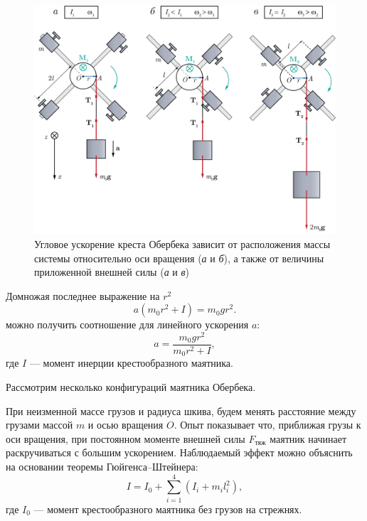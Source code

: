 \documentclass[All.tex]{subfiles}
\begin{document}
		\begin{figure}[H] 	
		\centering 	
		\includegraphics[width=0.9\linewidth]{oberbeck-4.png}
		\caption{Угловое ускорение креста Обербека зависит от расположения массы системы относительно оси вращения (\textit{а} и \textit{б}), а также от величины приложенной внешней силы (\textit{а} и \textit{в})}
		\label{oberbeck-4}
	\end{figure}
	
	
	Домножая последнее выражение на $ r^{2} $
	\begin{equation}\label{oberbeck-eq7}
	a(m_0r^{2} + I) = m_0gr^{2}.
	\end{equation}
	можно получить соотношение для линейного ускорения $ a $:
		\begin{equation}\label{oberbeck-eq8}
	a = \frac{m_0gr^{2}}{m_0r^{2} + I},
	\end{equation}
	где $ I $ — момент инерции крестообразного маятника.
	
   Рассмотрим несколько конфигураций маятника Обербека.
            
  При неизменной массе грузов и радиуса шкива, будем менять расстояние между грузами массой $ m $ и осью вращения $ O $.
    Опыт показывает что, приближая грузы к оси вращения, при постоянном моменте внешней силы $ F_{\text{тяж}} $ маятник начинает раскручиваться с большим ускорением.
    Наблюдаемый эффект можно объяснить на основании теоремы Гюйгенса–Штейнера: 
    \begin{equation}\label{oberbeck-eq9}
    I = I_{0} + \sum_{i = 1}^{4}(I_{i}+m_{i}l_{i}^{2}),
    \end{equation}
    где $ I_{0} $ — момент крестообразного маятника без грузов на стрежнях.
    
\end{document}
